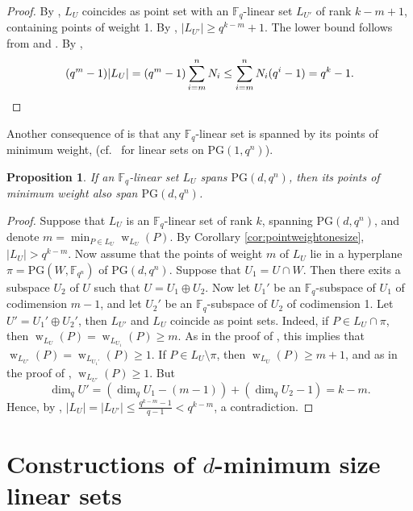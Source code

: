 \documentclass[11pt]{article}
\newtheorem{proposition}[theorem]{Proposition}
\theoremstyle{definition}
\newcommand{\F}{{\mathbb F}}
\newcommand{\fq}{{\mathbb F}_{q}}
\newcommand{\PG}{\mathrm{PG}}
\newcommand{\pg}{\PG}
\DeclareMathOperator{\ww}{w}
\begin{document}
\begin{proof}
 By , $L_U$ coincides as point set with an $\fq$-linear set $L_{U'}$ of rank $k-m+1$, containing points of weight 1.
 By , $|L_{U'}| \geq q^{k-m}+1$.
 The lower bound follows from  and .
 By ,
 \[
  (q^m-1) \lvert L_U \rvert=(q^m-1) \sum_{i=m}^n N_i \leq \sum_{i=m}^n N_i(q^i-1) = q^k-1 . \qedhere
 \]
\end{proof}

Another consequence of  is that any $\fq$-linear set is spanned by its points of minimum weight, (cf.\ \cite[Lemma 2.2]{bonoli2005fqlinear} for linear sets on $\pg(1,q^n)$).

\begin{proposition}
If an $\fq$-linear set $L_U$ spans $\pg(d,q^n)$, then its points of minimum weight also span $\pg(d,q^n)$.
\end{proposition}

\begin{proof}
Suppose that $L_U$ is an $\fq$-linear set of rank $k$, spanning $\pg(d,q^n)$, and denote $m = \min_{P \in L_U}{\ww_{L_U}(P)}$.
By Corollary \ref{cor:pointweightonesize}, $|L_U| > q^{k-m}$.
Now assume that the points of weight $m$ of $L_U$ lie in a hyperplane $\pi=\PG(W,\F_{q^n})$ of $\PG(d,q^n)$.
Suppose that $U_1 = U \cap W$.
Then there exits a subspace $U_2$ of $U$ such that $U = U_1 \oplus U_2$.
Now let $U_1'$ be an $\fq$-subspace of $U_1$ of codimension $m-1$, and let $U_2'$ be an $\fq$-subspace of $U_2$ of codimension 1.
Let $U' = U_1' \oplus U_2'$, then $L_{U'}$ and $L_U$ coincide as point sets.
Indeed, if $P \in L_U \cap \pi$, then $\ww_{L_U}(P) = \ww_{L_{U_1}}(P) \geq m$.
As in the proof of , this implies that $\ww_{L_{U'}}(P) = \ww_{L_{U_1'}}(P) \geq 1$.
If $P \in L_U \setminus \pi$, then $\ww_{L_U}(P) \geq m+1$, and as in the proof of , $\ww_{L_{U'}}(P) \geq 1$.
But
\[
 \dim_q U' = (\dim_q U_1 - (m-1)) + (\dim_q U_2 - 1) = k-m.
\]
Hence, by , $|L_U| = |L_{U'}| \leq \frac{q^{k-m}-1}{q-1} < q^{k-m}$, a contradiction.
\end{proof}




\section{Constructions of \texorpdfstring{$d$}{d}-minimum size linear sets}
 \label{sec:d-minSize}
\end{document}
